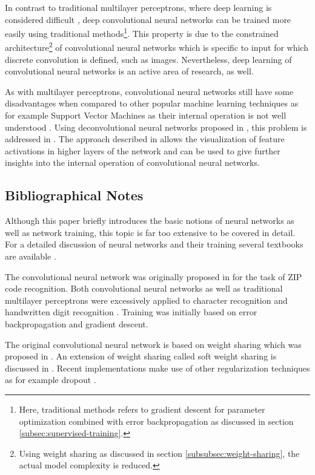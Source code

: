 In contrast to traditional multilayer perceptrons, where deep learning is considered difficult \cite{Bengio:2009}, deep convolutional neural networks can be trained more easily using traditional methods\footnote{Here, traditional methods refers to gradient descent for parameter optimization combined with error backpropagation as discussed in section \ref{subsec:supervised-training}.}. This property is due to the constrained architecture\footnote{Using weight sharing as discussed in section \ref{subsubsec:weight-sharing}, the actual model complexity is reduced.} of convolutional neural networks which is specific to input for which discrete convolution is defined, such as images. Nevertheless, deep learning of convolutional neural networks is an active area of research, as well.

As with multilayer perceptrons, convolutional neural networks still have some disadvantages when compared to other popular machine learning techniques as for example Support Vector Machines as their internal operation is not well understood \cite{ZeilerFergus:2013}. Using deconvolutional neural networks proposed in \cite{ZeilerKrishnanTaylorFergus:2010}, this problem is addressed in \cite{ZeilerFergus:2013}. The approach described in \cite{ZeilerFergus:2013} allows the visualization of feature activations in higher layers of the network and can be used to give further insights into the internal operation of convolutional neural networks.

\subsection{Bibliographical Notes}

Although this paper briefly introduces the basic notions of neural networks as well as network training, this topic is far too extensive to be covered in detail. For a detailed discussion of neural networks and their training several textbooks are available \cite{Bishop:1995,Bishop:2006,Haykin:2005}.

The convolutional neural network was originally proposed in \cite{LeCunBoserDenkerHenderson:1989} for the task of ZIP code recognition. Both convolutional neural networks as well as traditional multilayer perceptrons were excessively applied to character recognition and handwritten digit recognition \cite{LeCunBottouBengioHaffner:1998}. Training was initially based on error backpropagation \cite{RumelhartHintonWilliams:1986} and gradient descent.

The original convolutional neural network is based on weight sharing which was proposed in \cite{RumelhartHintonWilliams:1986}. An extension of weight sharing called soft weight sharing is discussed in \cite{NowlanHinton:1992}. Recent implementations make use of other regularization techniques as for example dropout \cite{HintonSrivastavaKrizhevskySutskeverSalakhutdinov:2012}.

